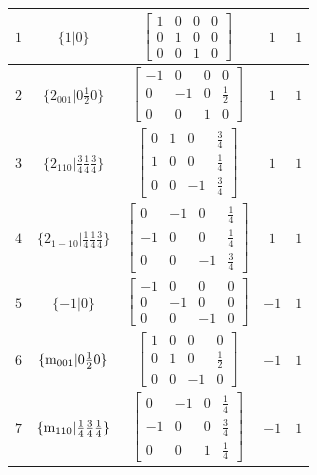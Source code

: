 \documentclass[fleqn,8pt]{jsarticle}
\begin{document}
\begin{longtable}{ccccc}
$ 1 $ & $ \{1|0\} $ & $ \begin{bmatrix} 1 & 0 & 0 & 0 \\ 0 & 1 & 0 & 0 \\ 0 & 0 & 1 & 0 \end{bmatrix} $ & $ 1 $ & $ 1 $ \\ \hline
$ 2 $ & $ \{2{}_{001}|0 \frac{1}{2} 0\} $ & $ \begin{bmatrix} -1 & 0 & 0 & 0 \\ 0 & -1 & 0 & \frac{1}{2} \\ 0 & 0 & 1 & 0 \end{bmatrix} $ & $ 1 $ & $ 1 $ \\ \hline
$ 3 $ & $ \{2{}_{110}|\frac{3}{4} \frac{1}{4} \frac{3}{4}\} $ & $ \begin{bmatrix} 0 & 1 & 0 & \frac{3}{4} \\ 1 & 0 & 0 & \frac{1}{4} \\ 0 & 0 & -1 & \frac{3}{4} \end{bmatrix} $ & $ 1 $ & $ 1 $ \\ \hline
$ 4 $ & $ \{2{}_{1-10}|\frac{1}{4} \frac{1}{4} \frac{3}{4}\} $ & $ \begin{bmatrix} 0 & -1 & 0 & \frac{1}{4} \\ -1 & 0 & 0 & \frac{1}{4} \\ 0 & 0 & -1 & \frac{3}{4} \end{bmatrix} $ & $ 1 $ & $ 1 $ \\ \hline
$ 5 $ & $ \{-1|0\} $ & $ \begin{bmatrix} -1 & 0 & 0 & 0 \\ 0 & -1 & 0 & 0 \\ 0 & 0 & -1 & 0 \end{bmatrix} $ & $ -1 $ & $ 1 $ \\ \hline
$ 6 $ & $ \{{\rm m}_{001}|0 \frac{1}{2} 0\} $ & $ \begin{bmatrix} 1 & 0 & 0 & 0 \\ 0 & 1 & 0 & \frac{1}{2} \\ 0 & 0 & -1 & 0 \end{bmatrix} $ & $ -1 $ & $ 1 $ \\ \hline
$ 7 $ & $ \{{\rm m}_{110}|\frac{1}{4} \frac{3}{4} \frac{1}{4}\} $ & $ \begin{bmatrix} 0 & -1 & 0 & \frac{1}{4} \\ -1 & 0 & 0 & \frac{3}{4} \\ 0 & 0 & 1 & \frac{1}{4} \end{bmatrix} $ & $ -1 $ & $ 1 $ \\ \hline

\end{longtable}
\end{document}
